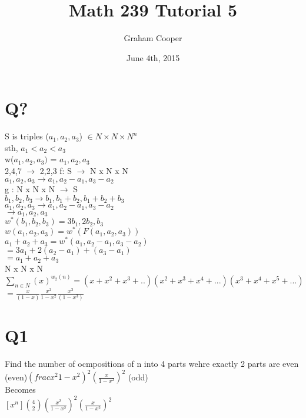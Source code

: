 \documentclass[12pt]{article}
\title{\vspace{-15ex}Math 239 Tutorial 5\vspace{-1ex}}
\date{June 4th, 2015}
\author{Graham Cooper}
\begin{document}
	\maketitle
	
	\section*{Q?}
	S is triples ($a_1, a_2, a_3$) $\in N \times N \times N^n$\\
	sth, $a_1 < a_2 < a_3$\\
	w($a_1, a_2, a_3)$ = $a_1, a_2, a_3$\\
	
	2,4,7 $\rightarrow$ 2,2,3
	f: S $\rightarrow$ N x N x N\\
	$a_1, a_2, a_3 \rightarrow a_1, a_2 - a_1, a_3 - a_2$\\
	g : N x N x N $\rightarrow$ S\\
	$b_1, b_2, b_3 \rightarrow b_1, b_1 + b_2, b_1 + b_2 + b_3$\\
	
	$a_1, a_2, a_3 \rightarrow a_1, a_2 - a_1, a_3 - a_2$\\
	$\rightarrow a_1, a_2, a_3$\\
	
	$w^*(b_1, b_2, b_3) = 3b_1, 2b_2, b_3$\\
	$w(a_1, a_2, a_3) = w^*(F(a_1, a_2, a_3))$\\
	$a_1 + a_2 + a_3 = w^*(a_1, a_2 - a_1, a_3 - a_2)$\\
	$ = 3a_1 + 2(a_2 - a_1) + (a_3 - a_1)$\\
	$ = a_1 + a_2 + a_3$\\
	
	N x N x N\\
	$\sum_{n \in N}(x)^{w_2(n)} = (x + x^2 + x^3 + ..)(x^2 + x^3 + x^4 + ...)(x^3 + x^4 + x^5 + ...)$\\
	$ = \frac{x}{(1-x)} \frac{x^2}{1-x^2}\frac{x^3}{(1-x^3)}$\\
	
	\section*{Q1}
	Find the number of ocmpositions of n into 4 parts wehre exactly 2 parts are even\\
	(even)$(frac{x^2}{1-x^2})^2(\frac{x}{1-x^2})^2$ (odd)\\
	
	Becomes\\
	$[x^n]{4 \choose 2}(\frac{x^2}{1-x^2})^2(\frac{x}{1-x^2})^2$\\
	
\end{document}
